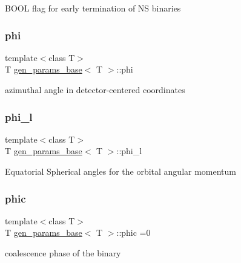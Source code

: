 B\+O\+OL flag for early termination of NS binaries \mbox{\label{classgen__params__base_a500f71cd641e52356d6371894f7d8a07}} 
\subsubsection{\texorpdfstring{phi}{phi}}
{\footnotesize\ttfamily template$<$class T$>$ \\
T \hyperlink{classgen__params__base}{gen\+\_\+params\+\_\+base}$<$ T $>$\+::phi}

azimuthal angle in detector-\/centered coordinates \mbox{\label{classgen__params__base_aaec5fafce24e74b099b713f47d25045f}} 
\subsubsection{\texorpdfstring{phi\+\_\+l}{phi\_l}}
{\footnotesize\ttfamily template$<$class T$>$ \\
T \hyperlink{classgen__params__base}{gen\+\_\+params\+\_\+base}$<$ T $>$\+::phi\+\_\+l}

Equatorial Spherical angles for the orbital angular momentum \mbox{\label{classgen__params__base_a4da02c658f87191c55bb040d5da46143}} 
\subsubsection{\texorpdfstring{phic}{phic}}
{\footnotesize\ttfamily template$<$class T$>$ \\
T \hyperlink{classgen__params__base}{gen\+\_\+params\+\_\+base}$<$ T $>$\+::phic =0}

coalescence phase of the binary \mbox{\label{classgen__params__base_abe5fc4017be70773feba6964cb9616e9}} 

